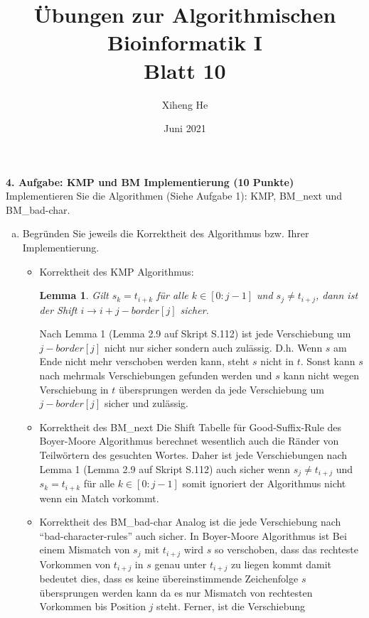 \documentclass{article}
\title{Übungen zur Algorithmischen Bioinformatik I\\
Blatt 10}
\author{Xiheng He}
\date{Juni 2021}
\newtheorem{lemma}{Lemma}
\begin{document}
\maketitle
\begin{flushleft}
\textbf{4. Aufgabe: KMP und BM Implementierung (10 Punkte)}
\newline
Implementieren Sie die Algorithmen (Siehe Aufgabe 1): KMP, BM\_next und BM\_bad-char.
\begin{enumerate}[(a)]
    \item Begründen Sie jeweils die Korrektheit des Algorithmus bzw. Ihrer Implementierung.
    \begin{itemize}
        \item Korrektheit des KMP Algorithmus:
        \begin{lemma}
            Gilt $s_k = t_{i + k}$ für alle $k \in [0 : j - 1]$ und $s_j \not = t_{i + j}$, dann ist der Shift
            $i \rightarrow i + j - border[j]$ sicher.
        \end{lemma}
        Nach Lemma 1 (Lemma 2.9 auf Skript S.112) ist jede Verschiebung um $j - border[j]$ nicht nur sicher sondern auch
        zulässig. D.h. Wenn $s$ am Ende nicht mehr verschoben werden kann, steht $s$ nicht in $t$. Sonst kann $s$ nach mehrmals
        Verschiebungen gefunden werden und $s$ kann nicht wegen Verschiebung in $t$ übersprungen werden da jede Verschiebung 
        um $j - border[j]$ sicher und zulässig.
        \item Korrektheit des BM\_next
        \newline
        Die Shift Tabelle für Good-Suffix-Rule des Boyer-Moore Algorithmus berechnet wesentlich auch die Ränder von Teilwörtern
        des gesuchten Wortes. Daher ist jede Verschiebungen nach Lemma 1 (Lemma 2.9 auf Skript S.112) auch sicher wenn $s_j \not = t_{i + j}$ 
        und $s_k = t_{i + k}$ für alle $k \in [0 : j - 1]$ somit ignoriert der Algorithmus nicht wenn ein Match vorkommt.
        \item Korrektheit des BM\_bad-char
        \newline 
        Analog ist die jede Verschiebung nach ``bad-character-rules'' auch sicher. In Boyer-Moore Algorithmus ist 
        \newline
        Bei einem Mismatch von $s_j$ mit $t_{i + j}$ wird $s$ so verschoben, dass das rechteste Vorkommen von $t_{i + j}$
        in $s$ genau unter $t_{i + j}$ zu liegen kommt damit bedeutet dies, dass es keine übereinstimmende Zeichenfolge $s$
        übersprungen werden kann da es nur Mismatch von rechtesten Vorkommen bis Position $j$ steht. Ferner, ist die Verschiebung

\end{itemize}
\end{enumerate}
\end{flushleft}
\end{document}

